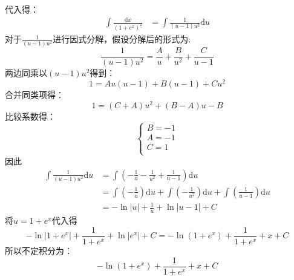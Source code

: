\documentclass[answers]{exam}
\begin{document}
\begin{questions}
\begin{solution}
		代入得：
		\begin{align*}
			\int\frac{\mathrm{d}x}{(1+e^x)^2} & = \int\frac{1}{(u-1)u^2}\mathrm{d}u
		\end{align*}
		对于$\frac{1}{(u-1)u^2}$进行因式分解，假设分解后的形式为:
		\begin{equation*}
			\frac{1}{(u-1)u^2} = \frac{A}{u} + \frac{B}{u^2} + \frac{C}{u-1}
		\end{equation*}
		两边同乘以$(u-1)u^2$得到：
		\begin{equation*}
			1 = Au(u-1) + B(u-1) + Cu^2
		\end{equation*}
		合并同类项得：
		\begin{equation*}
			1 = (C+A)u^2 + (B-A)u - B
		\end{equation*}
		比较系数得：
		\begin{equation*}
			\begin{cases}
				B = -1 \\
				A = -1 \\
				C = 1  \\
			\end{cases}
		\end{equation*}
		因此
		\begin{align*}
			\int\frac{1}{(u-1)u^2}\mathrm{d}u
			 & = \int\left(-\frac{1}{u} - \frac{1}{u^2} + \frac{1}{u-1}\right)\mathrm{d}u \\
			 & = \int\left(-\frac1u\right)\mathrm{d}u +
			\int\left(-\frac1{u^2}\right)\mathrm{d}u +
			\int\left(\frac1{u-1}\right)\mathrm{d}u                                       \\
			 & = -\ln|u| + \frac1u + \ln|u-1| + C
		\end{align*}
		将$u=1+e^x$代入得
		\begin{equation*}
			-\ln|1+e^x| + \frac{1}{1+e^x} + \ln|e^x| + C
			= -\ln(1+e^x) + \frac{1}{1+e^x} + x + C
		\end{equation*}
		所以不定积分为：
		{
		\boldmath
		\color{blue}
		\begin{equation*}
			-\ln(1+e^x) + \frac{1}{1+e^x} + x + C
		\end{equation*}
		}
	\end{solution}
\end{questions}
\end{document}
